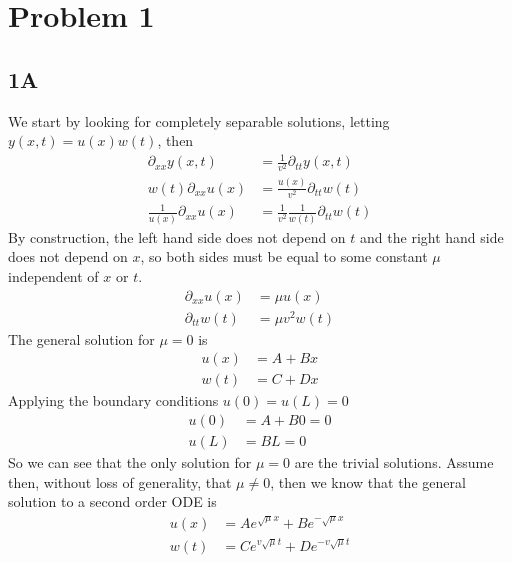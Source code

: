 \section*{Problem 1}
\subsection*{1A}
We start by looking for completely separable solutions, letting $y(x,t) = u(x)w(t)$, then
\begin{equation}
    \begin{split}
        \partial_{xx}y(x,t) &= \frac{1}{v^2}\partial_{tt}y(x,t)\\
        w(t)\partial_{xx}u(x) &= \frac{u(x)}{v^2}\partial_{tt}w(t)\\
        \frac{1}{u(x)}\partial_{xx}u(x) &= \frac{1}{v^2}\frac{1}{w(t)}\partial_{tt}w(t)
    \end{split}
\end{equation}
By construction, the left hand side does not depend on $t$ and the right hand side does not depend on $x$, so both sides must be equal to some constant $\mu$ independent of $x$ or $t$.
\begin{equation}
    \begin{split}
           \partial_{xx}u(x) &= \mu u(x)\\
           \partial_{tt}w(t) &= \mu v^2 w(t)
    \end{split}
\end{equation}
The general solution for $\mu = 0$ is
\begin{equation}
    \begin{split}
        u(x) &= A + Bx\\
        w(t) &= C + Dx
    \end{split}
\end{equation}
Applying the boundary conditions $u(0)=u(L)=0$
\begin{equation}
    \begin{split}
        u(0) &= A+B0=0\\
        u(L) &= BL = 0
    \end{split}
\end{equation}
So we can see that the only solution for $\mu=0$ are the trivial solutions. Assume then, without loss of generality, that $\mu \neq 0$, then we know that the general solution to a second order ODE is
\begin{equation}
    \begin{split}
        u(x) &= Ae^{\sqrt{\mu}x}+Be^{-\sqrt{\mu}x}\\
        w(t) &= Ce^{v\sqrt{\mu}t}+De^{-v\sqrt{\mu}t}
    \end{split}
\end{equation}
